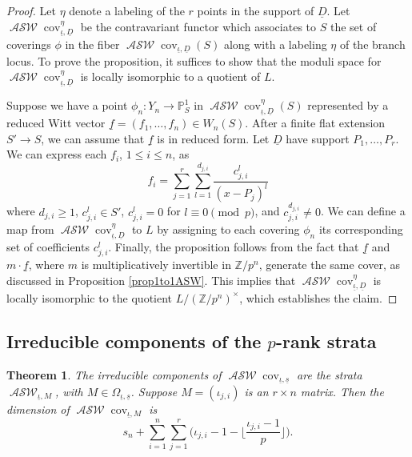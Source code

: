 \documentclass{compositio}
\newtheorem{theorem}{Theorem}[section]
\theoremstyle{remark}
\theoremstyle{remark}
\DeclareMathOperator{\cov}{cov}
\DeclareMathOperator{\ASW}{\mathcal{ASW}}
\begin{document}
\begin{proof}
Let $\eta$ denote a labeling of the $r$ points in the support of $\underline{D}$. Let $\ASW\cov^{\eta}_{\underline{\iota},\underline{D}}$ be the contravariant functor which associates to $S$ the set of coverings $\phi$ in the fiber $\ASW\cov_{\underline{\iota},\underline{D}}(S)$ along with a labeling $\eta$ of the branch locus. To prove the proposition, it suffices to show that the moduli space for $\ASW\cov^{\eta}_{\underline{\iota},\underline{D}}$ is locally isomorphic to a quotient of $L$.

Suppose we have a point $\phi_n: Y_n \xrightarrow{} \mathbb{P}^1_S$ in $\ASW\cov^{\eta}_{\underline{\iota},\underline{D}}(S)$ represented by a reduced Witt vector $\underline{f}=(f_1, \ldots, f_n) \in W_n(S)$. After a finite flat extension $S' \xrightarrow{} S$, we can assume that $\underline{f}$ is in reduced form. Let $\underline{D}$ have support ${P_1, \ldots, P_r}$. We can express each $f_i$, $1 \le i \le n$, as
\begin{equation*}
    f_i =\sum_{j=1}^r \sum_{l=1}^{d_{j,i}} \frac{c^l_{j,i}}{(x-P_j)^l}
\end{equation*}
where $d_{j,i}\ge 1$, $c_{j,i}^l \in S'$, $c_{j,i}^l=0$ for $l \equiv 0 \pmod{p}$, and $c_{j,i}^{d_{j,i}}\neq 0$. We can define a map from $\ASW\cov^{\eta}_{\underline{\iota},\underline{D}}$ to $L$ by assigning to each covering $\phi_n$ its corresponding set of coefficients $c^l_{j,i}$. Finally, the proposition follows from the fact that $\underline{f}$ and $m \cdot \underline{f}$, where $m$ is multiplicatively invertible in $\mathbb{Z}/p^n$, generate the same cover, as discussed in Proposition \ref{prop1to1ASW}. This implies that $\ASW\cov^{\eta}_{\underline{\iota},\underline{D}}$ is locally isomorphic to the quotient $L/(\mathbb{Z}/p^n)^{\times}$, which establishes the claim.
\end{proof}


\subsection{Irreducible components of the \texorpdfstring{$p$}{p}-rank strata}





\begin{theorem}
The irreducible components of $\ASW\cov_{\underline{\iota},\underline{s}}$ are the strata $\ASW_{\underline{\iota},M}$, with $M \in \Omega_{\underline{\iota}, \underline{s}}$. Suppose $M=(\iota_{j,i})$ is an $r \times n$ matrix. Then the dimension of $\ASW\cov_{\underline{\iota},M}$ is
\begin{equation}
\label{eqndimasw}
    s_n+\sum_{i=1}^n\sum_{j=1}^r \bigg( {\iota_{j,i}}-1 - \bigg\lfloor \frac{\iota_{j,i}-1}{p} \bigg\rfloor \bigg). 
\end{equation}
\end{theorem}
\end{document}
